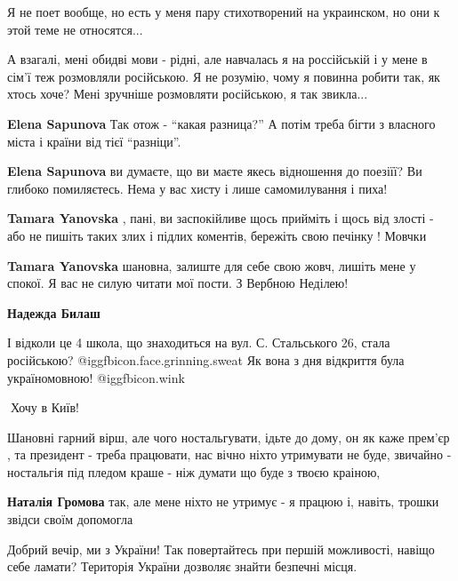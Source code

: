 \begin{itemize}
\begin{itemize}
\begin{itemize}

Я не поет вообще, но есть у меня пару стихотворений на украинском, но они к
этой теме не относятся...

А взагалі, мені обидві мови - рідні, але навчалась я на россійській і у мене в
сім'ї теж розмовляли російською. Я не розумію, чому я повинна робити так, як
хтось хоче? Мені зручніше розмовляти російською, я так звикла...

\textbf{Elena Sapunova} Так отож - \enquote{какая разница?} А потім треба бігти з власного міста і країни від тієї \enquote{разніци}.

\textbf{Elena Sapunova} ви думаєте, що ви маєте якесь відношення до поезіїї? Ви глибоко помиляєтесь. Нема у вас хисту і лише самомилування і пиха!

\textbf{Tamara Yanovska} , пані, ви заспокійливе щось прийміть і щось від злості - або не пишіть таких злих і підлих коментів, бережіть свою печінку ! Мовчки

\textbf{Tamara Yanovska} шановна, залиште для себе свою жовч, лишіть мене у спокої. Я вас не силую читати мої пости. З Вербною Неділею!
\end{itemize} %

\textbf{Надежда Билаш}

І відколи це 4 школа, що знаходиться на вул. С. Стальського 26, стала
російською? @igg{fbicon.face.grinning.sweat}  Як вона з дня відкриття була україномовною! @igg{fbicon.wink} 

\end{itemize} %

🥲Хочу в Київ!


Шановні гарний вірш, але чого ностальгувати, ідьте до дому, он як каже прем'єр
, та президент - треба працювати, нас вічно ніхто утримувати не буде, звичайно
- ностальгія під пледом краше - ніж думати що буде з твоєю краіною,

\textbf{Наталія Громова} так, але мене ніхто не утримує - я працюю і, навіть, трошки звідси своїм допомогла


Добрий вечір, ми з України! Так повертайтесь при першій можливості, навіщо себе
ламати? Територія України дозволяє знайти безпечні місця.


\end{itemize}
